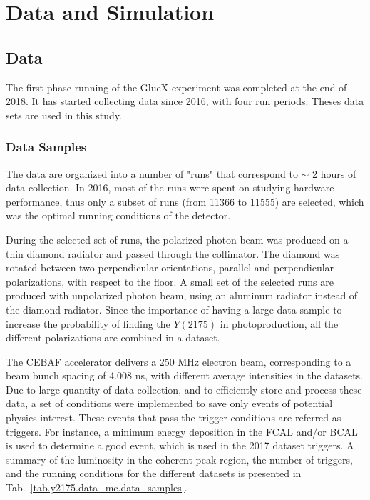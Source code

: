 \section{Data and Simulation}
\label{chap.y2175.data_mc}

\subsection{Data}

The first phase running of the GlueX experiment was completed at the end of 2018. It has started collecting data since 2016, with four run periods. Theses data sets are used in this study.

\subsubsection{Data Samples}
\label{chap.y2175.data_mc.data_samples}

The data are organized into a number of "runs" that correspond to $\sim$ 2 hours of data collection. In 2016, most of the runs were spent on studying hardware performance, thus only a subset of runs (from 11366 to 11555) are selected, which was the optimal running conditions of the detector.
~\par During the selected set of runs, the polarized photon beam was produced on a thin diamond radiator and passed through the collimator. The diamond was rotated between two perpendicular orientations, parallel and perpendicular polarizations, with respect to the floor. A small set of the selected runs are produced with unpolarized photon beam, using an aluminum radiator instead of the diamond radiator. Since the importance of having a large data sample to increase the probability of finding the $Y(2175)$ in photoproduction, all the different polarizations are combined in a dataset.
~\par The CEBAF accelerator delivers a 250 MHz electron beam, corresponding to a beam bunch spacing of 4.008 ns, with different average intensities in the datasets. Due to large quantity of data collection, and to efficiently store and process these data, a set of conditions were implemented to save only events of potential physics interest. These events that pass the trigger conditions are referred as triggers. For instance, a minimum energy deposition in the FCAL and/or BCAL is used to determine a good event, which is used in the 2017 dataset triggers. A summary of the luminosity in the coherent peak region, the number of triggers, and the running conditions for the different datasets is presented in Tab.~\ref{tab.y2175.data_mc.data_samples}.


